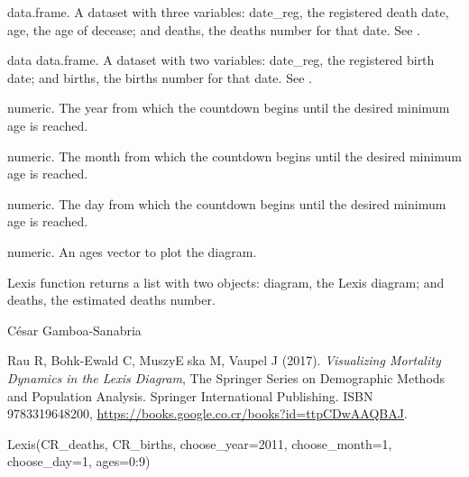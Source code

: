 \documentclass[a4paper]{book}
\begin{document}
\begin{Arguments}
\begin{ldescription}
\item[\code{deaths\_data}] data.frame. A dataset with three variables: date\_reg, the registered death date, age, the age of decease; and deaths, the deaths number for that date. See .

\item[\code{births\_data}] data data.frame. A dataset with two variables: date\_reg, the registered birth date; and births, the births number for that date. See .

\item[\code{choose\_year}] numeric. The year from which the countdown begins until the desired minimum age is reached.

\item[\code{choose\_month}] numeric. The month from which the countdown begins until the desired minimum age is reached.

\item[\code{choose\_day}] numeric. The day from which the countdown begins until the desired minimum age is reached.

\item[\code{ages}] numeric. An ages vector to plot the diagram.
\end{ldescription}
\end{Arguments}
%
\begin{Value}
Lexis function returns a list with two objects: diagram, the Lexis diagram; and deaths, the estimated deaths number.
\end{Value}
%
\begin{Author}\relax
César Gamboa-Sanabria
\end{Author}
%
\begin{References}\relax
Rau R, Bohk-Ewald C, MuszyEska M, Vaupel J (2017).
\emph{Visualizing Mortality Dynamics in the Lexis Diagram},  The Springer Series on Demographic Methods and Population Analysis.
Springer International Publishing.
ISBN 9783319648200, \url{https://books.google.co.cr/books?id=ttpCDwAAQBAJ}.
\end{References}
%
\begin{Examples}
\begin{ExampleCode}

Lexis(CR_deaths, CR_births, choose_year=2011, choose_month=1, choose_day=1, ages=0:9)

\end{ExampleCode}
\end{Examples}
\end{document}
